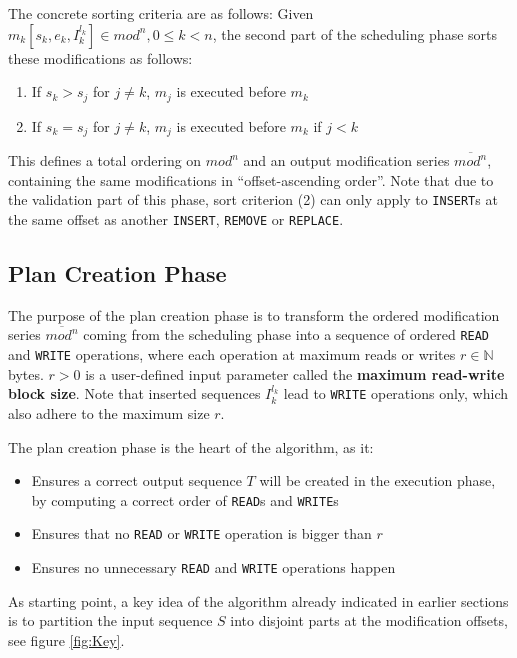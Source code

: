 \documentclass[english, 10pt, openright, twocolumn, landscape, twoside, notitlepage, a4paper, pdftex]		
{article}
\begin{document}
The concrete sorting criteria are as follows: Given $m_{k}[s_{k},e_{k},I_{k}^{l_{k}}]\in mod^{n}, 0\leq k< n$, the second part of the scheduling phase sorts these modifications as follows:
\begin{enumerate}
\item If $s_{k}>s_{j}$ for $j\neq k$, $m_{j}$ is executed before $m_{k}$
\item If $s_{k}=s_{j}$ for $j\neq k$, $m_{j}$ is executed before $m_{k}$ if $j<k$
\end{enumerate}

This defines a total ordering on $mod^{n}$ and an output modification series $\overline{mod^{n}}$, containing the same modifications in ``offset-ascending order''. Note that due to the validation part of this phase, sort criterion (2) can only apply to \texttt{INSERT}s at the same offset as another \texttt{INSERT}, \texttt{REMOVE} or \texttt{REPLACE}.

\subsection{Plan Creation Phase}%
\label{sec:PlanCreationPhase}%

The purpose of the plan creation phase is to transform the ordered modification series $\overline{mod^{n}}$ coming from the scheduling phase into a sequence of ordered \texttt{READ} and \texttt{WRITE} operations, where each operation at maximum reads or writes $r\in\mathbb{N}$ bytes. $r>0$ is a user-defined input parameter called the \textbf{maximum read-write block size}. Note that inserted sequences $I_{k}^{l_{k}}$ lead to \texttt{WRITE} operations only, which also adhere to the maximum size $r$.

The plan creation phase is the heart of the algorithm, as it:
\begin{itemize}
\item Ensures a correct output sequence $T$ will be created in the execution phase, by computing a correct order of \texttt{READ}s and \texttt{WRITE}s
\item Ensures that no \texttt{READ} or \texttt{WRITE} operation is bigger than $r$
\item Ensures no unnecessary \texttt{READ} and \texttt{WRITE} operations happen
\end{itemize}

As starting point, a key idea of the algorithm already indicated in earlier sections is to partition the input sequence $S$ into disjoint parts at the modification offsets, see figure \ref{fig:Key}.
\end{document}
